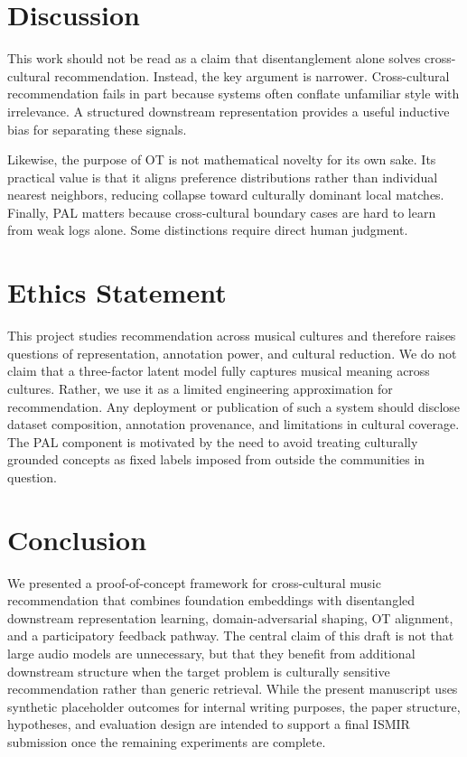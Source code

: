 \documentclass[10pt,twocolumn]{article}
\begin{document}
\section{Discussion}
This work should not be read as a claim that disentanglement alone solves cross-cultural recommendation.
Instead, the key argument is narrower.
Cross-cultural recommendation fails in part because systems often conflate unfamiliar style with irrelevance.
A structured downstream representation provides a useful inductive bias for separating these signals.

Likewise, the purpose of OT is not mathematical novelty for its own sake.
Its practical value is that it aligns preference distributions rather than individual nearest neighbors, reducing collapse toward culturally dominant local matches.
Finally, PAL matters because cross-cultural boundary cases are hard to learn from weak logs alone.
Some distinctions require direct human judgment.

\section{Ethics Statement}
This project studies recommendation across musical cultures and therefore raises questions of representation, annotation power, and cultural reduction.
We do not claim that a three-factor latent model fully captures musical meaning across cultures.
Rather, we use it as a limited engineering approximation for recommendation.
Any deployment or publication of such a system should disclose dataset composition, annotation provenance, and limitations in cultural coverage.
The PAL component is motivated by the need to avoid treating culturally grounded concepts as fixed labels imposed from outside the communities in question.

\section{Conclusion}
We presented a proof-of-concept framework for cross-cultural music recommendation that combines foundation embeddings with disentangled downstream representation learning, domain-adversarial shaping, OT alignment, and a participatory feedback pathway.
The central claim of this draft is not that large audio models are unnecessary, but that they benefit from additional downstream structure when the target problem is culturally sensitive recommendation rather than generic retrieval.
While the present manuscript uses synthetic placeholder outcomes for internal writing purposes, the paper structure, hypotheses, and evaluation design are intended to support a final ISMIR submission once the remaining experiments are complete.



\end{document}
